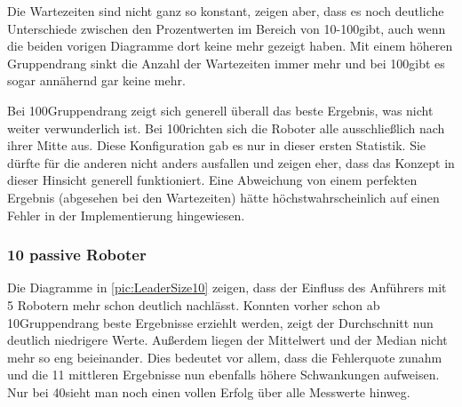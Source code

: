 Die Wartezeiten sind nicht ganz so konstant, zeigen aber, dass es noch deutliche Unterschiede zwischen den Prozentwerten im Bereich von 10-100\per gibt, auch wenn die beiden vorigen Diagramme dort keine mehr gezeigt haben. Mit einem höheren Gruppendrang sinkt die Anzahl der Wartezeiten immer mehr und bei 100\per gibt es sogar annähernd gar keine mehr.

Bei 100\per Gruppendrang zeigt sich generell überall das beste Ergebnis, was nicht weiter verwunderlich ist. Bei 100\per richten sich die Roboter alle ausschließlich nach ihrer Mitte aus. Diese Konfiguration gab es nur in dieser ersten Statistik. Sie dürfte für die anderen nicht anders ausfallen und zeigen eher, dass das Konzept in dieser Hinsicht generell funktioniert. Eine Abweichung von einem perfekten Ergebnis (abgesehen bei den Wartezeiten) hätte höchstwahrscheinlich auf einen Fehler in der Implementierung hingewiesen.

\newpage
\subsubsection*{10 passive Roboter}

Die Diagramme in \autoref{pic:LeaderSize10} zeigen, dass der Einfluss des Anführers mit 5 Robotern mehr schon deutlich nachlässt. Konnten vorher schon ab 10\per Gruppendrang beste Ergebnisse erziehlt werden, zeigt der Durchschnitt nun deutlich niedrigere Werte. Außerdem liegen der Mittelwert und der Median nicht mehr so eng beieinander. Dies bedeutet vor allem, dass die Fehlerquote zunahm und die 11 mittleren Ergebnisse nun ebenfalls höhere Schwankungen aufweisen. Nur bei 40\per sieht man noch einen vollen Erfolg über alle Messwerte hinweg.

